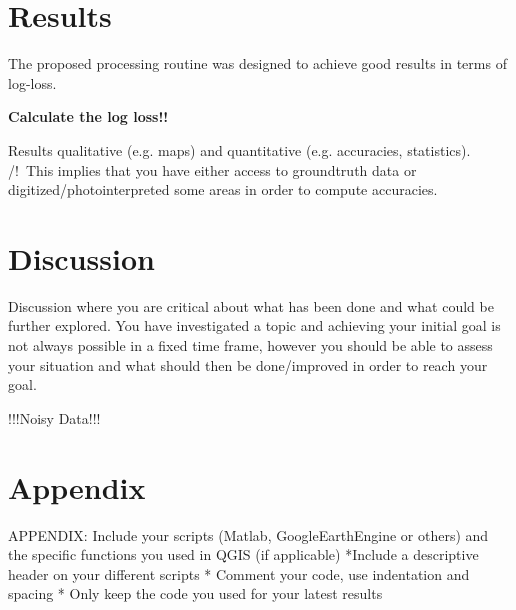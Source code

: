 \documentclass[11pt]{article}
\begin{document}
	
	\section{Results}
	
	The proposed processing routine was designed to achieve good results in terms of log-loss.
	
	\textbf{Calculate the log loss!!}
	
	
	Results qualitative (e.g. maps) and quantitative (e.g. accuracies, statistics). /!\ This implies that you have either access to groundtruth data or digitized/photointerpreted some areas in order to compute accuracies.
	
	\section{Discussion}
	\label{sec:discussion}
	Discussion where you are critical about what has been done and what could be further explored. You have investigated a topic and achieving your initial goal is not always possible in a fixed time frame, however you should be able to assess your situation and what should then be done/improved in order to reach your goal.
	
	
	!!!Noisy Data!!!
	
	\section{Appendix}
	APPENDIX: Include your scripts (Matlab, GoogleEarthEngine or others) and the specific functions you used in QGIS (if applicable)
	*Include a descriptive header on your different scripts
	* Comment your code, use indentation and spacing
	* Only keep the code you used for your latest results
	
	
	
	 
	
	
\end{document}

